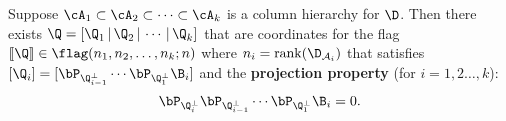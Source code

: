 \begin{prop}\label{prop:stiefel_coords_app}
    Suppose $\cA_1 \subset \cA_2 \subset \cdots \subset \cA_k$ is a column hierarchy for $\D$. Then there exists $\Q= [\Q_1\,|\,\Q_2\,|\, \cdots\,|\,\Q_k]$ that are coordinates for the flag $[\![\Q]\!]\in\flag(n_1,n_2,\dots,n_k;n)$ where $n_i = \mathrm{rank}(\D_{\mathcal{A}_i})$ that satisfies $[\Q_i] = [\bP_{\Q_{i-1}^\perp}\cdots \bP_{\Q_1^\perp}\B_i]$ and the \textbf{projection property} (for $i=1,2\dots,k$): 
    \begin{equation}\label{eq:projection_property_app}
    \bP_{\Q_i^\perp}\bP_{\Q_{i-1}^\perp}\cdots \bP_{\Q_1^\perp} \B_i = 0.
    \end{equation}
\end{prop}
